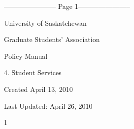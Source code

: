 ﻿----------------------- Page 1-----------------------

  

  

  

  

  

  

  

  

  

                                           University of Saskatchewan  

  

                                   Graduate Students’ Association  

  

  

  

  

  

  

  

  

  

  

  

  

  

  

  

  

  

  

  

  

  

  

  

                                                      Policy Manual  

  

                                                 4. Student Services  

  

  

  

  

  

  

  

Created April 13, 2010  

  

Last Updated: April 26, 2010  



                                                                    1  



